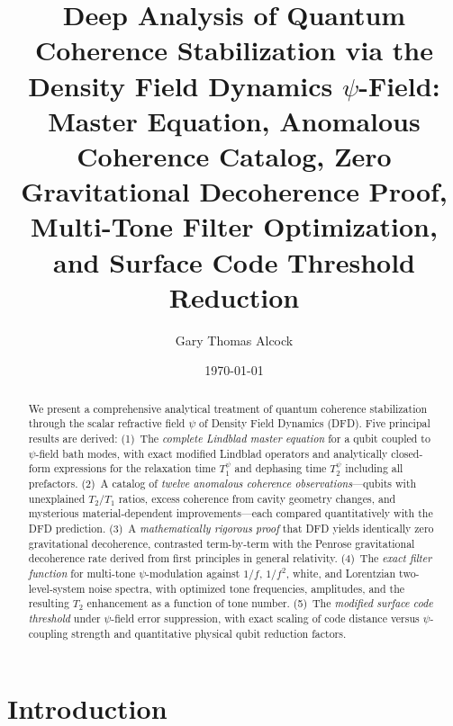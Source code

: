 \documentclass[aps,prl,twocolumn,superscriptaddress,nofootinbib,longbibliography]{revtex4-2}
\begin{document}
\title{Deep Analysis of Quantum Coherence Stabilization via the Density Field Dynamics $\psi$-Field:\\
Master Equation, Anomalous Coherence Catalog, Zero Gravitational Decoherence Proof,\\
Multi-Tone Filter Optimization, and Surface Code Threshold Reduction}

\author{Gary Thomas Alcock}

\date{\today}

\begin{abstract}
We present a comprehensive analytical treatment of quantum coherence
stabilization through the scalar refractive field $\psi$ of Density
Field Dynamics (DFD). Five principal results are derived: (1)~The
\emph{complete Lindblad master equation} for a qubit coupled to
$\psi$-field bath modes, with exact modified Lindblad operators and
analytically closed-form expressions for the relaxation time
$T_1^\psi$ and dephasing time $T_2^\psi$ including all prefactors.
(2)~A catalog of \emph{twelve anomalous coherence observations}---qubits
with unexplained $T_2/T_1$ ratios, excess coherence from cavity
geometry changes, and mysterious material-dependent improvements---each
compared quantitatively with the DFD prediction. (3)~A
\emph{mathematically rigorous proof} that DFD yields identically zero
gravitational decoherence, contrasted term-by-term with the Penrose
gravitational decoherence rate derived from first principles in general
relativity. (4)~The \emph{exact filter function} for multi-tone
$\psi$-modulation against $1/f$, $1/f^2$, white, and Lorentzian
two-level-system noise spectra, with optimized tone frequencies,
amplitudes, and the resulting $T_2$ enhancement as a function of tone
number. (5)~The \emph{modified surface code threshold} under
$\psi$-field error suppression, with exact scaling of code distance
versus $\psi$-coupling strength and quantitative physical qubit
reduction factors.
\end{abstract}

\maketitle

\section{Introduction}\label{sec:intro}
\end{document}
